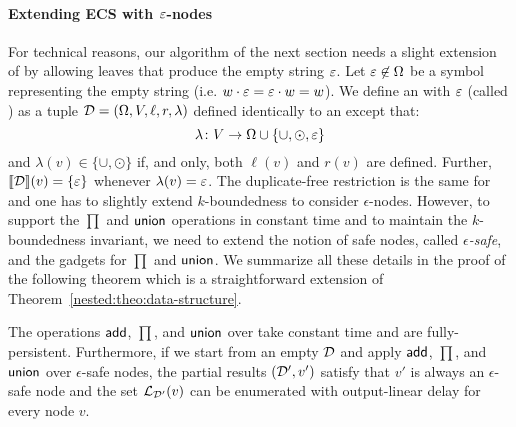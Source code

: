 \paragraph{Extending ECS with $\varepsilon$-nodes}
For technical reasons, our algorithm of the next section needs a slight extension of \dsabbr{} by allowing leaves that produce the empty string $\varepsilon$. Let $\varepsilon\not\in\Omega$ be a symbol representing the empty string (i.e. $w\cdot\varepsilon = \varepsilon\cdot w = w$). We define an \dsname{} with $\varepsilon$ (called \dsepsabbr) as a tuple $\mathcal{D} = (\Omega, V, \ell, r, \lambda)$ defined identically to an \dsabbr{} except that:
\[
\lambda\colon V\to\Omega\cup\{\cup, \odot,\varepsilon\}
\] 
and $\lambda(v)\in\{\cup,\odot\}$ if, and only, both $\ell(v)$ and $r(v)$ are defined. Further, ${\llbracket{\mathcal{D}}\rrbracket}(v) = \{\varepsilon\}$ whenever $\lambda(v) = \varepsilon$. The duplicate-free restriction is the same for \dsepsabbr and one has to slightly extend $k$-boundedness to consider $\epsilon$-nodes. %
However, to support the $\prod$ and $\mathsf{union}$ operations in constant time and to maintain the $k$-boundedness invariant, we need to extend the notion of safe nodes, called \emph{$\epsilon$-safe}, and the gadgets for $\prod$ and $\mathsf{union}$. We summarize all these details in the proof of the following theorem which is a straightforward extension of Theorem~\ref{nested:theo:data-structure}.

 
\begin{theorem}\label{nested:theo:data-structure-eps}
	The operations $\mathsf{add}$, $\prod$, and $\mathsf{union}$ over \dsepsabbr{} take constant time and are fully-persistent. Furthermore, if we start from an empty \dsepsabbr{} $\mathcal{D}$ and apply $\mathsf{add}$, $\prod$, and $\mathsf{union}$ over $\epsilon$-safe nodes, the partial results $(\mathcal{D}', v')$ satisfy that $v'$ is always an $\epsilon$-safe node and the set $\mathcal{L}_{\mathcal{D}'}(v)$ can be enumerated with output-linear delay for every node $v$.
\end{theorem}  





	




